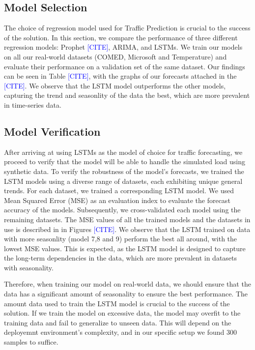 \subsection{Model Selection}


The choice of regression model used for Traffic Prediction is crucial to the success of the solution.
In this section, we compare the performance of three different regression models: Prophet \textcolor{blue}{[CITE]}, ARIMA, and LSTMs.
We train our models on all our real-world datasets (COMED, Microsoft and Temperature) and evaluate their performance on a validation set of the same dataset.
Our findings can be seen in Table \textcolor{blue}{[CITE]}, with the graphs of our forecasts attached in the \textcolor{blue}{[CITE]}.
We observe that the LSTM model outperforms the other models, capturing the trend and seasonlity of the data the best, which are more prevalent in time-series data.
\subsection{Model Verification}


After arriving at using LSTMs as the model of choice for traffic forecasting, we proceed to verify that the model will be able to handle the simulated load using synthetic data.
To verify the robustness of the model's forecasts, we trained the LSTM models using a diverse range of datasets, each exhibiting unique general trends.
For each dataset, we trained a corresponding LSTM model. 
We used Mean Squared Error (MSE) as an evaluation index to evaluate the forecast accuracy of the models.
Subsequently, we cross-validated each model using the remaining datasets.
The MSE values of all the trained models and the datasets in use is described in in Figures \textcolor{blue}{[CITE]}.
We observe that the LSTM trained on data with more seasonlity (model 7,8 and 9) perform the best all around, with the lowest MSE values.
This is expected, as the LSTM model is designed to capture the long-term dependencies in the data, which are more prevalent in datasets with seasonality.
  
Therefore, when training our model on real-world data, we should ensure that the data has a significant amount of seasonality to ensure the best performance.  
The amount data used to train the LSTM model is crucial to the success of the solution.
If we train the model on excessive data, the model may overfit to the training data and fail to generalize to unseen data.
This will depend on the deployemnt environment's complexity, and in our specific setup we found 300 samples to suffice.

